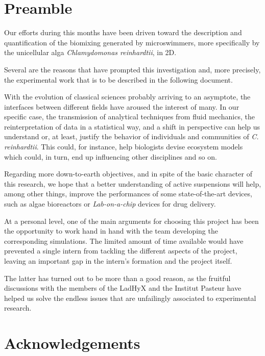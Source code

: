 \chapter*{Preamble}
\thispagestyle{empty}
Our efforts during this months have been driven toward the description and quantification of the biomixing generated by microswimmers, more specifically by the unicellular alga \textit{Chlamydomonas reinhardtii}, in 2D.

Several are the reasons that have prompted this investigation and, more precisely, the experimental work that is to be described in the following document.

With the evolution of classical sciences probably arriving to an asymptote, the interfaces between different fields have aroused the interest of many. In our specific case, the transmission of analytical techniques from fluid mechanics, the reinterpretation of data in a statistical way, and a shift in perspective can help us understand or, at least, justify the behavior of individuals and communities of \textit{C. reinhardtii}. This could, for instance, help biologists devise ecosystem models which could, in turn, end up influencing other disciplines and so on.

Regarding more down-to-earth objectives, and in spite of the basic character of this research, we hope that a better understanding of active suspensions will help, among other things, improve the performances of some state-of-the-art devices, such as algae bioreactors or \textit{Lab-on-a-chip} devices for drug delivery.

At a personal level, one of the main arguments for choosing this project has been the opportunity to work hand in hand with the team developing the corresponding simulations. The limited amount of time available would have prevented a single intern from tackling the different aspects of the project, leaving an important gap in the intern's formation and the project itself.

The latter has turned out to be more than a good reason, as the fruitful discussions with the members of the LadHyX and the Institut Pasteur have helped us solve the endless issues that are unfailingly associated to experimental research.

\cleardoublepage %

\chapter*{Acknowledgements}


